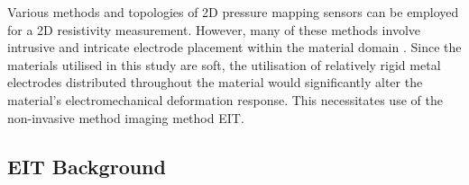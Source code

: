 
Various methods and topologies of 2D pressure mapping sensors can be employed for a 2D resistivity measurement. However, many of these methods involve intrusive and intricate electrode placement within the material domain \citep{Goncalves2017,Loew2019,Silvera-Tawil2015,Lee2019,Gilanizadehdizaj2022,Zhu2021}. Since the materials utilised in this study are soft, the utilisation of relatively rigid metal electrodes distributed throughout the material would significantly alter the material's electromechanical deformation response. This necessitates use of the non-invasive method imaging method EIT. 



\subsection{EIT Background} \label{sec:Background}

